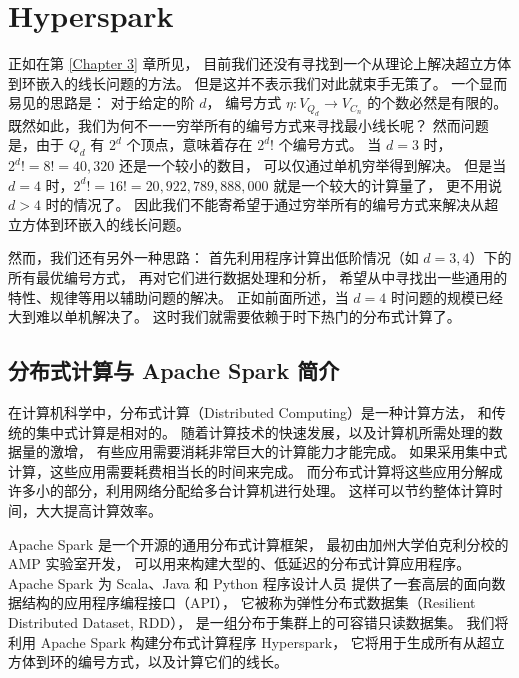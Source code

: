 
\chapter{Hyperspark}
\label{Chapter 4}

正如在第 \ref{Chapter 3} 章所见，
目前我们还没有寻找到一个从理论上解决超立方体到环嵌入的线长问题的方法。
但是这并不表示我们对此就束手无策了。
一个显而易见的思路是：
对于给定的阶 $d$，
编号方式 $\eta \colon V_{Q_d} \rightarrow V_{C_n}$ 的个数必然是有限的。
既然如此，我们为何不一一穷举所有的编号方式来寻找最小线长呢？
然而问题是，由于 $Q_d$ 有 $2^d$ 个顶点，意味着存在 $2^d !$ 个编号方式。
当 $d = 3$ 时，$2^d ! = 8 ! = 40,320$ 还是一个较小的数目，
可以仅通过单机穷举得到解决。
但是当 $d = 4$ 时，$2^d ! = 16 ! = 20,922,789,888,000$ 就是一个较大的计算量了，
更不用说 $d > 4$ 时的情况了。
因此我们不能寄希望于通过穷举所有的编号方式来解决从超立方体到环嵌入的线长问题。

然而，我们还有另外一种思路：
首先利用程序计算出低阶情况（如 $d = 3, 4$）下的所有最优编号方式，
再对它们进行数据处理和分析，
希望从中寻找出一些通用的特性、规律等用以辅助问题的解决。
正如前面所述，当 $d = 4$ 时问题的规模已经大到难以单机解决了。
这时我们就需要依赖于时下热门的分布式计算了。

\section{分布式计算与 Apache Spark 简介}
\label{Section 4.1}

在计算机科学中，分布式计算（Distributed Computing）是一种计算方法，
和传统的集中式计算是相对的。
随着计算技术的快速发展，以及计算机所需处理的数据量的激增，
有些应用需要消耗非常巨大的计算能力才能完成。
如果采用集中式计算，这些应用需要耗费相当长的时间来完成。
而分布式计算将这些应用分解成许多小的部分，利用网络分配给多台计算机进行处理。
这样可以节约整体计算时间，大大提高计算效率。

Apache Spark 是一个开源的通用分布式计算框架，
最初由加州大学伯克利分校的 AMP 实验室开发，
可以用来构建大型的、低延迟的分布式计算应用程序。
Apache Spark 为 Scala、Java 和 Python 程序设计人员
提供了一套高层的面向数据结构的应用程序编程接口（API），
它被称为弹性分布式数据集（Resilient Distributed Dataset, RDD），
是一组分布于集群上的可容错只读数据集。
我们将利用 Apache Spark 构建分布式计算程序 Hyperspark，
它将用于生成所有从超立方体到环的编号方式，以及计算它们的线长。

